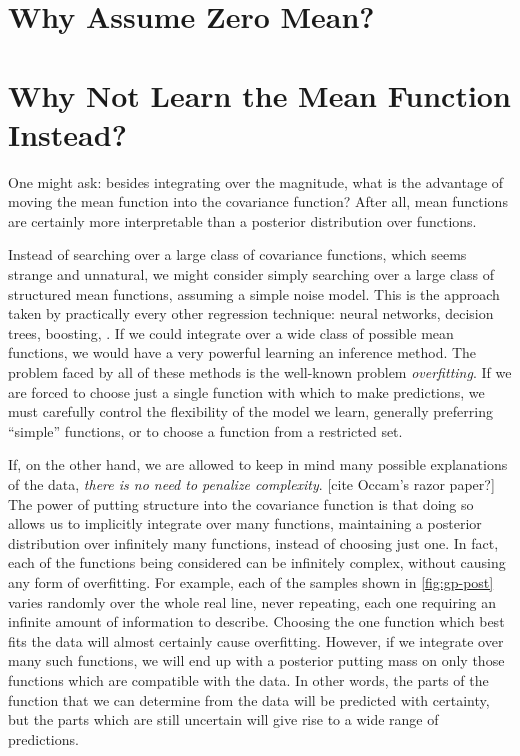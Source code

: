 \iffalse
\section{Why Assume Zero Mean?}

\section{Why Not Learn the Mean Function Instead?}
One might ask: besides integrating over the magnitude, what is the advantage of moving the mean function into the covariance function?
After all, mean functions are certainly more interpretable than a posterior distribution over functions.

Instead of searching over a large class of covariance functions, which seems strange and unnatural, we might consider simply searching over a large class of structured mean functions, assuming a simple \iid noise model.
This is the approach taken by practically every other regression technique: neural networks, decision trees, boosting, \etc.
If we could integrate over a wide class of possible mean functions, we would have a very powerful learning an inference method.
The problem faced by all of these methods is the well-known problem \emph{overfitting}.
If we are forced to choose just a single function with which to make predictions, we must carefully control the flexibility of the model we learn, generally preferring ``simple'' functions, or to choose a function from a restricted set.

If, on the other hand, we are allowed to keep in mind many possible explanations of the data, \emph{there is no need to penalize complexity}. [cite Occam's razor paper?]
The power of putting structure into the covariance function is that doing so allows us to implicitly integrate over many functions, maintaining a posterior distribution over infinitely many functions, instead of choosing just one.
In fact, each of the functions being considered can be infinitely complex, without causing any form of overfitting.
For example, each of the samples shown in \cref{fig:gp-post} varies randomly over the whole real line, never repeating, each one requiring an infinite amount of information to describe.
Choosing the one function which best fits the data will almost certainly cause overfitting.
However, if we integrate over many such functions, we will end up with a posterior putting mass on only those functions which are compatible with the data.
In other words, the parts of the function that we can determine from the data will be predicted with certainty, but the parts which are still uncertain will give rise to a wide range of predictions.

